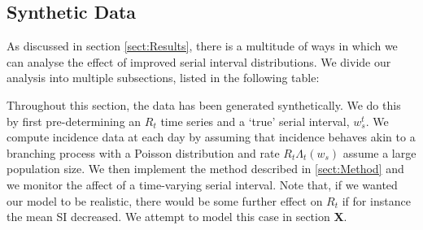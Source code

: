 \documentclass[10pt,journal,compsoc]{IEEEtran}
\begin{document}
 
 



 

  
\subsection{Synthetic Data}

As discussed in section \ref{sect:Results}, there is a multitude of ways in which we can analyse the effect of improved serial interval distributions. We divide our analysis into multiple subsections, listed in the following table:

Throughout this section, the data has been generated synthetically. We do this by first pre-determining an $R_t$ time series and a `true' serial interval, $w_s^t$. We compute incidence data at each day by assuming that incidence behaves akin to a branching process with a Poisson distribution and rate $R_t\Lambda_t (w_s)$ assume a large population size. We then implement the method described in \ref{sect:Method} and we monitor the affect of a time-varying serial interval. Note that, if we wanted our model to be realistic, there would be some further effect on $R_t$ if for instance the mean SI decreased. We attempt to model this case in section \textbf{X}.
  
\end{document}

